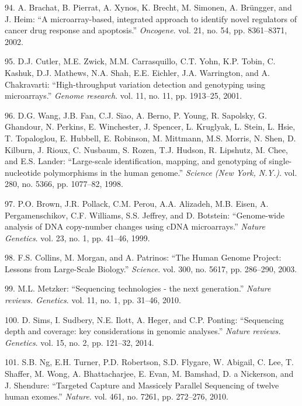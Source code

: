 \documentclass[12pt,twoside]{reedthesis}
\theoremstyle{definition}
\theoremstyle{definition}
\theoremstyle{remark}
\begin{document}
  \hypertarget{ref-Brachat2002}{}
  94. A. Brachat, B. Pierrat, A. Xynos, K. Brecht, M. Simonen, A.
  Brüngger, and J. Heim: ``A microarray-based, integrated approach to
  identify novel regulators of cancer drug response and apoptosis.''
  \emph{Oncogene}. vol. 21, no. 54, pp. 8361--8371, 2002.
  
  \hypertarget{ref-Cutler2001}{}
  95. D.J. Cutler, M.E. Zwick, M.M. Carrasquillo, C.T. Yohn, K.P. Tobin,
  C. Kashuk, D.J. Mathews, N.A. Shah, E.E. Eichler, J.A. Warrington, and
  A. Chakravarti: ``High-throughput variation detection and genotyping
  using microarrays.'' \emph{Genome research}. vol. 11, no. 11, pp.
  1913--25, 2001.
  
  \hypertarget{ref-Wang1998}{}
  96. D.G. Wang, J.B. Fan, C.J. Siao, A. Berno, P. Young, R. Sapolsky, G.
  Ghandour, N. Perkins, E. Winchester, J. Spencer, L. Kruglyak, L. Stein,
  L. Hsie, T. Topaloglou, E. Hubbell, E. Robinson, M. Mittmann, M.S.
  Morris, N. Shen, D. Kilburn, J. Rioux, C. Nusbaum, S. Rozen, T.J.
  Hudson, R. Lipshutz, M. Chee, and E.S. Lander: ``Large-scale
  identification, mapping, and genotyping of single-nucleotide
  polymorphisms in the human genome.'' \emph{Science (New York, N.Y.)}.
  vol. 280, no. 5366, pp. 1077--82, 1998.
  
  \hypertarget{ref-Brown1999}{}
  97. P.O. Brown, J.R. Pollack, C.M. Perou, A.A. Alizadeh, M.B. Eisen, A.
  Pergamenschikov, C.F. Williams, S.S. Jeffrey, and D. Botstein:
  ``Genome-wide analysis of DNA copy-number changes using cDNA
  microarrays.'' \emph{Nature Genetics}. vol. 23, no. 1, pp. 41--46, 1999.
  
  \hypertarget{ref-Collins2003}{}
  98. F.S. Collins, M. Morgan, and A. Patrinos: ``The Human Genome
  Project: Lessons from Large-Scale Biology.'' \emph{Science}. vol. 300,
  no. 5617, pp. 286--290, 2003.
  
  \hypertarget{ref-Metzker2010}{}
  99. M.L. Metzker: ``Sequencing technologies - the next generation.''
  \emph{Nature reviews. Genetics}. vol. 11, no. 1, pp. 31--46, 2010.
  
  \hypertarget{ref-Sims2014}{}
  100. D. Sims, I. Sudbery, N.E. Ilott, A. Heger, and C.P. Ponting:
  ``Sequencing depth and coverage: key considerations in genomic
  analyses.'' \emph{Nature reviews. Genetics}. vol. 15, no. 2, pp.
  121--32, 2014.
  
  \hypertarget{ref-Ng2010}{}
  101. S.B. Ng, E.H. Turner, P.D. Robertson, S.D. Flygare, W. Abigail, C.
  Lee, T. Shaffer, M. Wong, A. Bhattacharjee, E. Evan, M. Bamshad, D. a
  Nickerson, and J. Shendure: ``Targeted Capture and Massicely Parallel
  Sequencing of twelve human exomes.'' \emph{Nature}. vol. 461, no. 7261,
  pp. 272--276, 2010.
  
\end{document}
